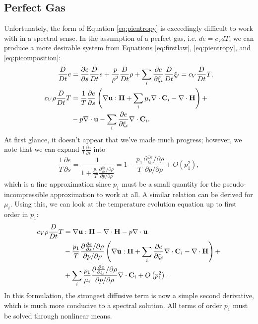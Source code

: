 
\subsection{Perfect Gas} %
\label{sub:perfect}

Unfortunately, the form of Equation \ref{eq:pientropy} is exceedingly difficult to work with in a spectral sense.
In the assumption of a perfect gas, i.e. $de=c_{V}dT$, we can produce a more desirable system from Equations \ref{eq:firstlaw}, \ref{eq:pientropy}, and \ref{eq:picomposition}:
\begin{align}
	\frac{D}{Dt}e&=\frac{\partial e}{\partial s}\frac{D}{Dt}s+\frac{p}{\rho^{2}}\frac{D}{Dt}\rho+\sum_{i}\frac{\partial e}{\partial \xi_{i}}\frac{D}{Dt}\xi_{i}=c_{V}\frac{D}{Dt}T,\\
	c_{V}\rho\frac{D}{Dt}T&=\frac{1}{T}\frac{\partial e}{\partial s}\left(\nabla\mathbf{u}:\mathbf{\Pi}+\sum_{i}\mu_{i}\nabla\cdot\mathbf{C}_{i}-\nabla\cdot{\mathbf{H}}\right)+\nonumber\\
	&-p\nabla\cdot\mathbf{u}-\sum_{i}\frac{\partial e}{\partial \xi_{i}}\nabla\cdot\mathbf{C}_{i}.
\end{align}
At first glance, it doesn't appear that we've made much progress; however, we note that we can expand $\frac{1}{T}\frac{\partial e}{\partial s}$ into
\begin{equation}
	\frac{1}{T}\frac{\partial e}{\partial s}=\frac{1}{1+\frac{p_{1}}{T}\frac{\partial \frac{\partial e}{\partial s}/\partial\rho}{\partial p/\partial\rho}}=1-\frac{p_{1}}{T}\frac{\partial \frac{\partial e}{\partial s}/\partial\rho}{\partial p/\partial\rho}+O\left(p_{1}^{2}\right),
\end{equation}
which is a fine approximation since $p_1$ must be a small quantity for the pseudo-incompressible approximation to work at all.
A similar relation can be derived for $\mu_{i}$.
Using this, we can look at the temperature evolution equation up to first order in $p_{1}$:
\begin{align}
	c_{V}\rho\frac{D}{Dt}T&=\nabla\mathbf{u}:\mathbf{\Pi}-\nabla\cdot{\mathbf{H}}-p\nabla\cdot\mathbf{u}\nonumber\\
	&-\frac{p_{1}}{T}\frac{\partial \frac{\partial e}{\partial s}/\partial\rho}{\partial p/\partial\rho}\left(\nabla\mathbf{u}:\mathbf{\Pi}+\sum_{i}\frac{\partial e}{\partial \xi_{i}}\nabla\cdot\mathbf{C}_{i}-\nabla\cdot{\mathbf{H}}\right)+\nonumber\\
	&+\sum_{i}\frac{p_{1}}{\mu_{i}}\frac{\partial \frac{\partial e}{\partial \xi_{i}}/\partial\rho}{\partial p/\partial\rho}\nabla\cdot\mathbf{C}_{i}+O\left(p_{1}^{2}\right).
\end{align}
In this formulation, the strongest diffusive term is now a simple second derivative, which is much more conducive to a spectral solution.
All terms of order $p_{1}$ must be solved through nonlinear means.


